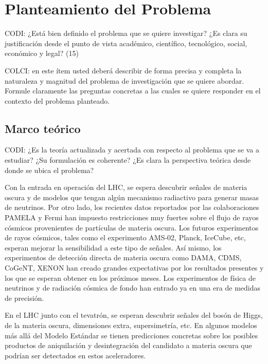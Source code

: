 \section{ Planteamiento del Problema }
\begin{instrucciones}
  CODI: ¿Está bien definido el problema que se quiere investigar? ¿Es clara su justificación desde el punto de vista académico, científico, tecnológico, social, económico y legal? (15)

  COLCI: en este ítem usted deberá describir de forma precisa y completa la
  naturaleza y magnitud del problema de investigación que se quiere
  abordar. Formule claramente las preguntas concretas a las cuales se
  quiere responder en el contexto del problema planteado.
\end{instrucciones}



\subsection{Marco teórico}
\begin{instrucciones}
 CODI: ¿Es la teoría actualizada y acertada con respecto al problema que se va a estudiar? ¿Su formulación es coherente? ¿Es clara la perspectiva teórica desde donde se ubica el problema?
\end{instrucciones}

Con la entrada en operación del LHC, se espera descubrir señales de materia oscura y de modelos que tengan algún mecanismo radiactivo para generar masas de neutrinos.
Por otro lado, los recientes datos reportados por las colaboraciones PAMELA y Fermi han impuesto restricciones muy fuertes sobre el flujo de rayos cósmicos provenientes de partículas de materia oscura. Los futuros experimentos de rayos cósmicos, tales como el experimento AMS-02, Planck, IceCube, etc, esperan mejorar la sensibilidad a este tipo de señales. Así mismo, los experimentos de detección directa de materia oscura como DAMA, CDMS, CoGeNT, XENON han creado grandes expectativas por los resultados presentes y los que se esperan obtener en los próximos meses. Los experimentos de física de neutrinos y de radiación cósmica de fondo han entrado ya en una era de medidas de precisión.

En el LHC junto con el tevatrón, se esperan descubrir señales del bosón de Higgs, de la materia oscura, dimensiones extra, supersimetría, etc. En algunos modelos más allá del Modelo Estándar se tienen predicciones concretas sobre los posibles productos de aniquilación y desintegración del candidato a materia oscura que podrían ser detectados en estos aceleradores.

